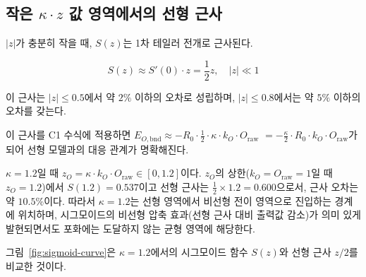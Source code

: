 \subsection{작은 $\kappa \cdot z$ 값 영역에서의 선형 근사}
\label{subsec:linear-approx}

$|z|$가 충분히 작을 때, $S(z)$는  1차 테일러 전개로 근사된다.

\begin{equation}
  S(z) \approx S'(0) \cdot z = \frac{1}{2} z, \quad |z| \ll 1
  \label{eq:linear-approx}
\end{equation}

이 근사는 $|z| \leq 0.5$에서 약 $2\%$ 이하의 오차로 성립하며,
$|z| \leq 0.8$에서는 약 $5\%$ 이하의 오차를 갖는다.

이 근사를 C1 수식에 적용하면
$E_{O,\text{bnd}} \approx -R_0 \cdot \frac{1}{2} \cdot \kappa \cdot k_O \cdot O_{\text{raw}}$
$= -\frac{\kappa}{2} \cdot R_0 \cdot k_O \cdot O_{\text{raw}}$가 되어
선형 모델과의 대응 관계가 명확해진다.

$\kappa = 1.2$일 때 $z_O = \kappa \cdot k_O \cdot O_{\text{raw}} \in [0, 1.2]$이다.
$z_O$의 상한($k_O = O_{\text{raw}} = 1$일 때 $z_O = 1.2$)에서 $S(1.2) = 0.537$이고
선형 근사는 $\frac{1}{2} \times 1.2 = 0.600$으로서, 근사 오차는 약 $10.5\%$이다.
따라서 $\kappa = 1.2$는 선형 영역에서 비선형 전이 영역으로 진입하는 경계에 위치하며,
시그모이드의 비선형 압축 효과(선형 근사 대비 출력값 감소)가 의미 있게 발현되면서도
포화에는 도달하지 않는 균형 영역에 해당한다.

\p{[}그림~\ref{fig:sigmoid-curve}\p{]}은 $\kappa = 1.2$에서의 시그모이드 함수
$S(z)$와 선형 근사 $z/2$를 비교한 것이다.

